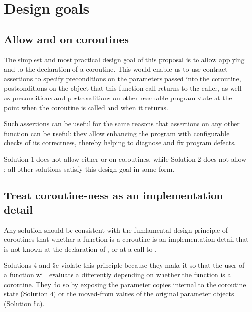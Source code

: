 \section{Design goals}

\subsection{Allow  and  on coroutines}

The simplest and most practical design goal of this proposal is to allow applying  and  to the declaration of a coroutine. This would enable us to use contract assertions to specify preconditions on the parameters passed into the coroutine, postconditions on the object that this function call returns to the caller, as well as preconditions and postconditions on other reachable program state at the point when the coroutine is called and when it returns.

Such assertions can be useful for the same reasons that assertions on any other function can be useful: they allow enhancing the program with configurable checks of its correctness, thereby helping to diagnose and fix program defects.

Solution 1 does not allow either  or  on coroutines, while Solution 2 does not allow ; all other solutions satisfy this design goal in some form.

\subsection{Treat coroutine-ness as an implementation detail}
\label{goal_coro_principle}

Any solution should be consistent with the fundamental design principle of coroutines that whether a function  is a coroutine is an implementation detail that is not known at the declaration of , or at a call to .

Solutions 4 and 5c violate this principle because they make it so that the user of a function will evaluate a  differently depending on whether the function is a coroutine. They do so by exposing the parameter copies internal to the coroutine state (Solution 4) or the moved-from values of the original parameter objects (Solution 5c).

